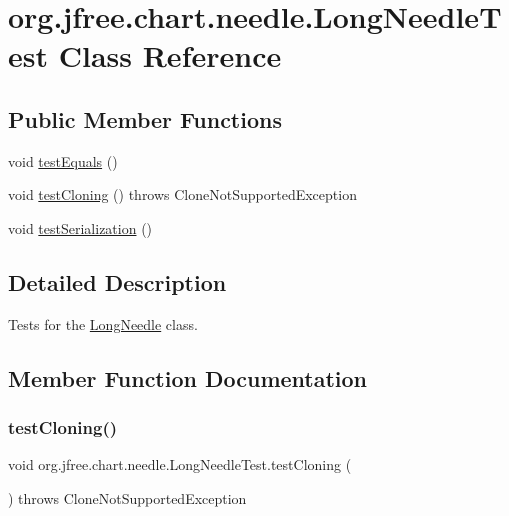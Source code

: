 \hypertarget{classorg_1_1jfree_1_1chart_1_1needle_1_1_long_needle_test}{}\section{org.\+jfree.\+chart.\+needle.\+Long\+Needle\+Test Class Reference}
\label{classorg_1_1jfree_1_1chart_1_1needle_1_1_long_needle_test}
\subsection*{Public Member Functions}
\begin{DoxyCompactItemize}
\item 
void \mbox{\hyperlink{classorg_1_1jfree_1_1chart_1_1needle_1_1_long_needle_test_a447138391b410d5f3544ec7aea1092a1}{test\+Equals}} ()
\item 
void \mbox{\hyperlink{classorg_1_1jfree_1_1chart_1_1needle_1_1_long_needle_test_af514e5e9cd6b0feb6cff7da2aeb3cca5}{test\+Cloning}} ()  throws Clone\+Not\+Supported\+Exception 
\item 
void \mbox{\hyperlink{classorg_1_1jfree_1_1chart_1_1needle_1_1_long_needle_test_ac9097cc5713c052dbbfbdc7c33419f9c}{test\+Serialization}} ()
\end{DoxyCompactItemize}


\subsection{Detailed Description}
Tests for the \mbox{\hyperlink{classorg_1_1jfree_1_1chart_1_1needle_1_1_long_needle}{Long\+Needle}} class. 

\subsection{Member Function Documentation}
\mbox{\label{classorg_1_1jfree_1_1chart_1_1needle_1_1_long_needle_test_af514e5e9cd6b0feb6cff7da2aeb3cca5}} 
\subsubsection{\texorpdfstring{test\+Cloning()}{testCloning()}}
{\footnotesize\ttfamily void org.\+jfree.\+chart.\+needle.\+Long\+Needle\+Test.\+test\+Cloning (\begin{DoxyParamCaption}{ }\end{DoxyParamCaption}) throws Clone\+Not\+Supported\+Exception}

